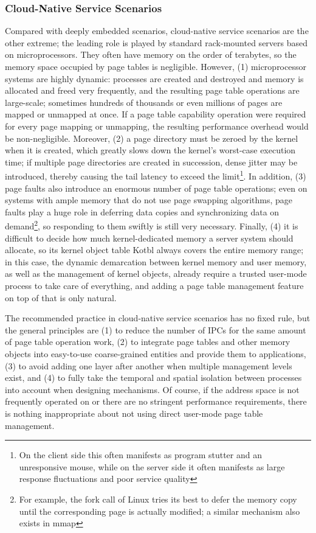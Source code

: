 \subsubsection{Cloud-Native Service Scenarios}\label{subsubsec:9-cloud-native-scenario}

Compared with deeply embedded scenarios, cloud-native service scenarios are the other extreme; the leading role is played by standard rack-mounted servers based on microprocessors. They often have memory on the order of terabytes, so the memory space occupied by page tables is negligible. However, (1) microprocessor systems are highly dynamic: processes are created and destroyed and memory is allocated and freed very frequently, and the resulting page table operations are large-scale; sometimes hundreds of thousands or even millions of pages are mapped or unmapped at once. If a page table capability operation were required for every page mapping or unmapping, the resulting performance overhead would be non-negligible. Moreover, (2) a page directory must be zeroed by the kernel when it is created, which greatly slows down the kernel's worst-case execution time; if multiple page directories are created in succession, dense jitter may be introduced, thereby causing the tail latency to exceed the limit\footnote{On the client side this often manifests as program stutter and an unresponsive mouse, while on the server side it often manifests as large response fluctuations and poor service quality}. In addition, (3) page faults also introduce an enormous number of page table operations; even on systems with ample memory that do not use page swapping algorithms, page faults play a huge role in deferring data copies and synchronizing data on demand\footnote{For example, the fork call of Linux tries its best to defer the memory copy until the corresponding page is actually modified; a similar mechanism also exists in mmap}, so responding to them swiftly is still very necessary. Finally, (4) it is difficult to decide how much kernel-dedicated memory a server system should allocate, so its kernel object table Kotbl always covers the entire memory range; in this case, the dynamic demarcation between kernel memory and user memory, as well as the management of kernel objects, already require a trusted user-mode process to take care of everything, and adding a page table management feature on top of that is only natural.

The recommended practice in cloud-native service scenarios has no fixed rule, but the general principles are (1) to reduce the number of IPCs for the same amount of page table operation work, (2) to integrate page tables and other memory objects into easy-to-use coarse-grained entities and provide them to applications, (3) to avoid adding one layer after another when multiple management levels exist, and (4) to fully take the temporal and spatial isolation between processes into account when designing mechanisms. Of course, if the address space is not frequently operated on or there are no stringent performance requirements, there is nothing inappropriate about not using direct user-mode page table management.

